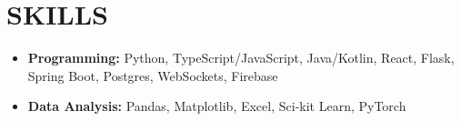 \section*{SKILLS}
\noindent
\begin{itemize}
	\item \textbf{Programming:} Python, TypeScript/JavaScript, Java/Kotlin, React, Flask, Spring Boot, Postgres, WebSockets, Firebase
	\item \textbf{Data Analysis:} Pandas, Matplotlib, Excel, Sci-kit Learn, PyTorch
\end{itemize}
